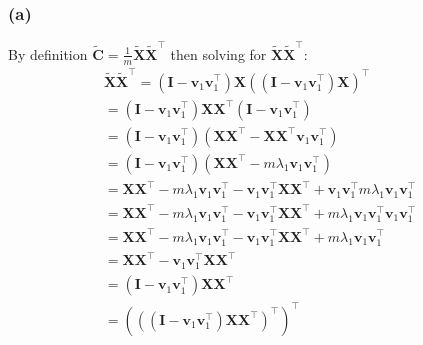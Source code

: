 \documentclass[11pt, oneside]{article}   	%
\begin{document}
\subsubsection{(a)}
By definition $\boldsymbol{\tilde{C}} = \frac{1}{m} \boldsymbol{\tilde{X}} \boldsymbol{\tilde{X}}^{\top}$ then solving for $\boldsymbol{\tilde{X}} \boldsymbol{\tilde{X}}^{\top}$:
\begin{gather*}
\boldsymbol{\tilde{X}} \boldsymbol{\tilde{X}}^{\top}
= (\boldsymbol{I} - \boldsymbol{v}_{1} \boldsymbol{v}_{1}^{\top})\boldsymbol{X} ((\boldsymbol{I} - \boldsymbol{v}_{1} \boldsymbol{v}_{1}^{\top})\boldsymbol{X})^{\top}\\
= (\boldsymbol{I} - \boldsymbol{v}_{1} \boldsymbol{v}_{1}^{\top})\boldsymbol{X} \boldsymbol{X}^{\top}(\boldsymbol{I} - \boldsymbol{v}_{1} \boldsymbol{v}_{1}^{\top}) \\
= (\boldsymbol{I} - \boldsymbol{v}_{1} \boldsymbol{v}_{1}^{\top})(\boldsymbol{X} \boldsymbol{X}^{\top} - \boldsymbol{X} \boldsymbol{X}^{\top}\boldsymbol{v}_{1} \boldsymbol{v}_{1}^{\top})\\
= (\boldsymbol{I} - \boldsymbol{v}_{1} \boldsymbol{v}_{1}^{\top})(\boldsymbol{X} \boldsymbol{X}^{\top} - m\lambda_1\boldsymbol{v}_{1} \boldsymbol{v}_{1}^{\top})\\
= \boldsymbol{X} \boldsymbol{X}^{\top} - m\lambda_1\boldsymbol{v}_{1} \boldsymbol{v}_{1}^{\top} - \boldsymbol{v}_{1} \boldsymbol{v}_{1}^{\top}\boldsymbol{X} \boldsymbol{X}^{\top} + \boldsymbol{v}_{1} \boldsymbol{v}_{1}^{\top}m\lambda_1\boldsymbol{v}_{1} \boldsymbol{v}_{1}^{\top}\\
= \boldsymbol{X} \boldsymbol{X}^{\top} - m\lambda_1\boldsymbol{v}_{1} \boldsymbol{v}_{1}^{\top} - \boldsymbol{v}_{1} \boldsymbol{v}_{1}^{\top}\boldsymbol{X} \boldsymbol{X}^{\top} + m\lambda_1\boldsymbol{v}_{1} \boldsymbol{v}_{1}^{\top}\boldsymbol{v}_{1} \boldsymbol{v}_{1}^{\top}\\
= \boldsymbol{X} \boldsymbol{X}^{\top} - m\lambda_1\boldsymbol{v}_{1} \boldsymbol{v}_{1}^{\top} - \boldsymbol{v}_{1} \boldsymbol{v}_{1}^{\top}\boldsymbol{X} \boldsymbol{X}^{\top} + m\lambda_1\boldsymbol{v}_{1} \boldsymbol{v}_{1}^{\top}\\
= \boldsymbol{X} \boldsymbol{X}^{\top} - \boldsymbol{v}_{1} \boldsymbol{v}_{1}^{\top}\boldsymbol{X} \boldsymbol{X}^{\top}\\
= (\boldsymbol{I} - \boldsymbol{v}_{1} \boldsymbol{v}_{1}^{\top})\boldsymbol{X} \boldsymbol{X}^{\top}\\
= (((\boldsymbol{I} - \boldsymbol{v}_{1} \boldsymbol{v}_{1}^{\top})\boldsymbol{X} \boldsymbol{X}^{\top})^{\top})^{\top}\\

\end{gather*}
\end{document}
